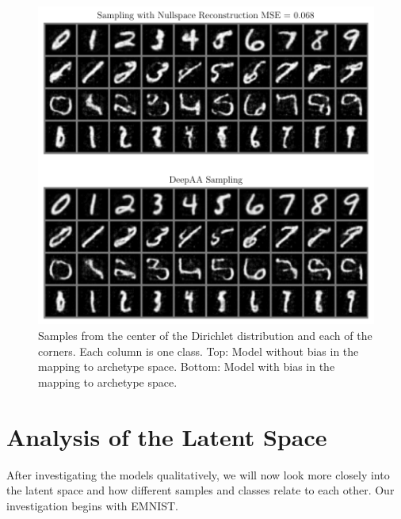 \begin{figure}[htpb]
	\centering
        \includegraphics{figures/samples/aa_nullspace_bias_y.pdf}
        \caption{Samples from the center of the Dirichlet distribution and each
        of the corners. Each column is one class. Top: Model without bias in
        the mapping to archetype space. Bottom: Model with bias in the mapping to
        archetype space.}%
        \label{fig:aa_nullspace_bias}
\end{figure}

\section{Analysis of the Latent Space}%
\label{sec:analysis_of_the_latent_space}

After investigating the models qualitatively, we will now look more closely
into the latent space and how different samples and classes relate to each
other. Our investigation begins with EMNIST.

